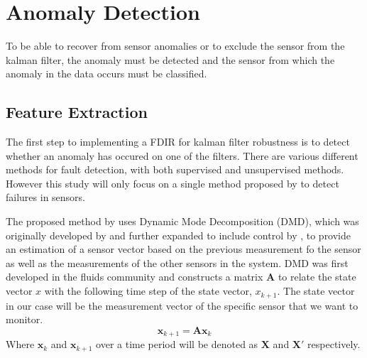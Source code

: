 \documentclass[letterpaper, 10 pt, conference]{ieeeconf}  %
\begin{document}
\section{Anomaly Detection}
To be able to recover from sensor anomalies or to exclude the sensor from the kalman filter, the anomaly must be detected and the sensor from which the anomaly in the data occurs must be classified.

\subsection{Feature Extraction}
The first step to implementing a FDIR for kalman filter robustness is to detect whether an anomaly has occured on one of the filters. There are various different methods for fault detection, with both supervised and unsupervised methods. However this study will only focus on a single method proposed by \textcite{DeSilva2020} to detect failures in sensors.

The proposed method by \textcite{DeSilva2020} uses Dynamic Mode Decomposition (DMD), which was originally developed by \textcite{schmid2011applications} and further expanded to include control by \textcite{proctor2016dynamic}, to provide an estimation of a sensor vector based on the previous measurement fo the sensor as well as the measurements of the other sensors in the system. DMD was first developed in the fluids community and constructs a matrix $\mathbf{A}$ to relate the state vector $x$ with the following time step of the state vector, $x_{k+1}$. The state vector in our case will be the measurement vector of the specific sensor that we want to monitor.
\begin{equation}
	\mathbf{x}_{k+1} = \mathbf{Ax}_k
\end{equation}
Where $\mathbf{x}_k$ and $\mathbf{x}_{k+1}$ over a time period will be denoted as $\mathbf{X}$ and $\mathbf{X'}$ respectively.
\end{document}
